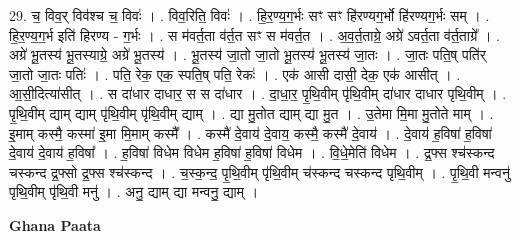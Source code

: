 \documentclass[17pt]{extarticle}
\begin{document}
29. च॒ विव॒र् विव॑श्च च॒ विवः॑ । . विव॒रिति॒ विवः॑ । . हि॒र॒ण्य॒ग॒र्भः सꣳ सꣳ हि॑रण्यग॒र्भो हि॑रण्यग॒र्भः सम् । . हि॒र॒ण्य॒ग॒र्भ इति॑ हिरण्य - ग॒र्भः । . स म॑वर्त॒ता व॑र्त॒त सꣳ स म॑वर्त॒त । . अ॒व॒र्त॒ताग्रे॒ अग्रे॑ ऽवर्त॒ता व॑र्त॒ताग्रे᳚ । . अग्रे॑ भू॒तस्य॑ भू॒तस्याग्रे॒ अग्रे॑ भू॒तस्य॑ । . भू॒तस्य॑ जा॒तो जा॒तो भू॒तस्य॑ भू॒तस्य॑ जा॒तः । . जा॒तः पति॒ष् पति॑र् जा॒तो जा॒तः पतिः॑ । . पति॒ रेक॒ एक॒ स्पति॒ष् पति॒ रेकः॑ । . एक॑ आसी दासी॒ देक॒ एक॑ आसीत् । . आ॒सी॒दित्या॑सीत् । . स दा॑धार दाधार॒ स स दा॑धार । . दा॒धा॒र॒ पृ॒थि॒वीम् पृ॑थि॒वीम् दा॑धार दाधार पृथि॒वीम् । . पृ॒थि॒वीम् द्याम् द्याम् पृ॑थि॒वीम् पृ॑थि॒वीम् द्याम् । . द्या मु॒तोत द्याम् द्या मु॒त । . उ॒तेमा मि॒मा मु॒तोते माम् । . इ॒माम् कस्मै॒ कस्मा॑ इ॒मा मि॒माम् कस्मै᳚ । . कस्मै॑ दे॒वाय॑ दे॒वाय॒ कस्मै॒ कस्मै॑ दे॒वाय॑ । . दे॒वाय॑ ह॒विषा॑ ह॒विषा॑ दे॒वाय॑ दे॒वाय॑ ह॒विषा᳚ । . ह॒विषा॑ विधेम विधेम ह॒विषा॑ ह॒विषा॑ विधेम । . वि॒धे॒मेति॑ विधेम । . द्र॒फ्स श्च॑स्कन्द चस्कन्द द्र॒फ्सो द्र॒फ्स श्च॑स्कन्द । . च॒स्क॒न्द॒ पृ॒थि॒वीम् पृ॑थि॒वीम् च॑स्कन्द चस्कन्द पृथि॒वीम् । . पृ॒थि॒वी मन्वनु॑ पृथि॒वीम् पृ॑थि॒वी मनु॑ । . अनु॒ द्याम् द्या मन्वनु॒ द्याम् । \newline

\textbf{Ghana Paata } \newline
\end{document}
